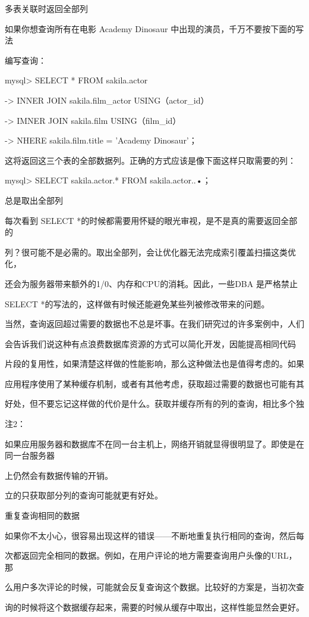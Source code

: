 多表关联时返回全部列

如果你想查询所有在电影 Academy Dinosaur 中出现的演员，千万不要按下面的写法

编写查询：

mysql> SELECT * FROM sakila.actor

-> INNER JOIN sakila.film\_actor USING（actor\_id）

-> IMNER JOIN sakila.film USING（film\_id）

-> NHERE sakila.film.title = 'Academy Dinosaur'；

这将返回这三个表的全部数据列。正确的方式应该是像下面这样只取需要的列：

mysql> SELECT sakila.actor.* FROM sakila.actor..•；

总是取出全部列

每次看到 SELECT *的时候都需要用怀疑的眼光审视，是不是真的需要返回全部的

列？很可能不是必需的。取出全部列，会让优化器无法完成索引覆盖扫描这类优化，

还会为服务器带来额外的1/0、内存和CPU的消耗。因此，一些DBA 是严格禁止

SELECT *的写法的，这样做有时候还能避免某些列被修改带来的问题。

当然，查询返回超过需要的数据也不总是坏事。在我们研究过的许多案例中，人们

会告诉我们说这种有点浪费数据库资源的方式可以简化开发，因能提高相同代码

片段的复用性，如果清楚这样做的性能影响，那么这种做法也是值得考虑的。如果

应用程序使用了某种缓存机制，或者有其他考虑，获取超过需要的数据也可能有其

好处，但不要忘记这样做的代价是什么。获取并缓存所有的列的查询，相比多个独

注2：

如果应用服务器和数据库不在同一台主机上，网络开销就显得很明显了。即使是在同一台服务器

上仍然会有数据传输的开销。

立的只获取部分列的查询可能就更有好处。

重复查询相同的数据

如果你不太小心，很容易出现这样的错误——不断地重复执行相同的查询，然后每

次都返回完全相同的数据。例如，在用户评论的地方需要查询用户头像的URL，那

么用户多次评论的时候，可能就会反复查询这个数据。比较好的方案是，当初次查

询的时候将这个数据缓存起来，需要的时候从缓存中取出，这样性能显然会更好。

